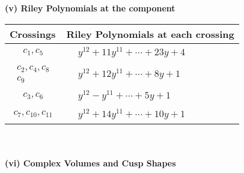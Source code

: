 \documentclass[1p]{elsarticle_modified}
\theoremstyle{definition}
\begin{document}
\newpage\renewcommand{\arraystretch}{1}
\flushleft \textbf{(v) Riley Polynomials at the component}\newline \\
\begin{tabular}{m{50pt}|m{274pt}}
Crossings & \hspace{64pt}Riley Polynomials at each crossing \\
\hline $$\begin{aligned}c_{1},c_{5}\end{aligned}$$&$\begin{aligned}
&y^{12}+11 y^{11}+\cdots+23 y+4
\end{aligned}$\\
\hline $$\begin{aligned}c_{2},c_{4},c_{8}\\c_{9}\end{aligned}$$&$\begin{aligned}
&y^{12}+12 y^{11}+\cdots+8 y+1
\end{aligned}$\\
\hline $$\begin{aligned}c_{3},c_{6}\end{aligned}$$&$\begin{aligned}
&y^{12}- y^{11}+\cdots+5 y+1
\end{aligned}$\\
\hline $$\begin{aligned}c_{7},c_{10},c_{11}\end{aligned}$$&$\begin{aligned}
&y^{12}+14 y^{11}+\cdots+10 y+1
\end{aligned}$\\
\hline
\end{tabular}\\~\\
\newpage\flushleft \textbf{(vi) Complex Volumes and Cusp Shapes}
\end{document}
